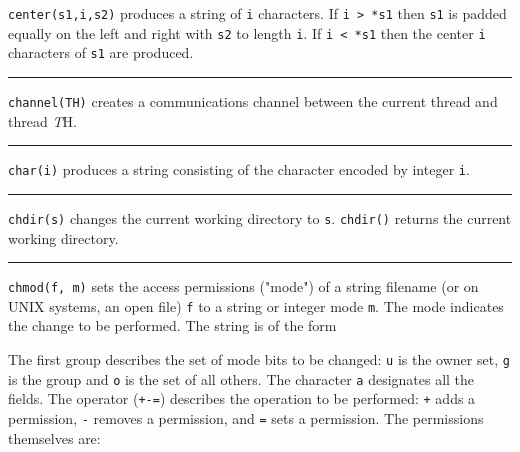 \noindent
{}\texttt{center(s1,i,s2)} produces a
string of \texttt{i} characters. If \texttt{i {\textgreater} *s1} then
\texttt{s1} is padded equally on the left and right with \texttt{s2} to
length \texttt{i}. If \texttt{i {\textless} *s1} then the center
\texttt{i} characters of \texttt{s1} are produced.

\bigskip\hrule\vspace{0.1cm}

\noindent
{}\texttt{channel(TH)} creates a communications channel
between the current thread and thread {\textit TH}.

\bigskip\hrule\vspace{0.1cm}

\noindent
{}\texttt{char(i)} produces a string consisting of the
character encoded by integer \texttt{i}.

\bigskip\hrule\vspace{0.1cm}

\noindent
{}\texttt{chdir(s)} changes the current
working directory to \texttt{s}. \texttt{chdir()} returns the current
working directory.

\bigskip\hrule\vspace{0.1cm}

\noindent
{}
\texttt{chmod(f,
m)} sets the access permissions ("mode") of
a string filename (or on UNIX systems, an open file) \texttt{f} to a
string or integer mode \texttt{m}. The mode indicates the change to be
performed. The string is of the form

\iconcode{
\>   [ugoa]*[+-=][rwxRWXstugo]* }

The first group describes the set of mode bits to be changed: \texttt{u}
is the owner set, \texttt{g} is the group and \texttt{o} is the set of
all others. The character \texttt{a} designates all the fields. The
operator (\texttt{+-=}) describes the operation to be performed:
\texttt{+} adds a permission, \texttt{{}-} removes a permission, and
\texttt{=} sets a permission. The permissions themselves are: 

